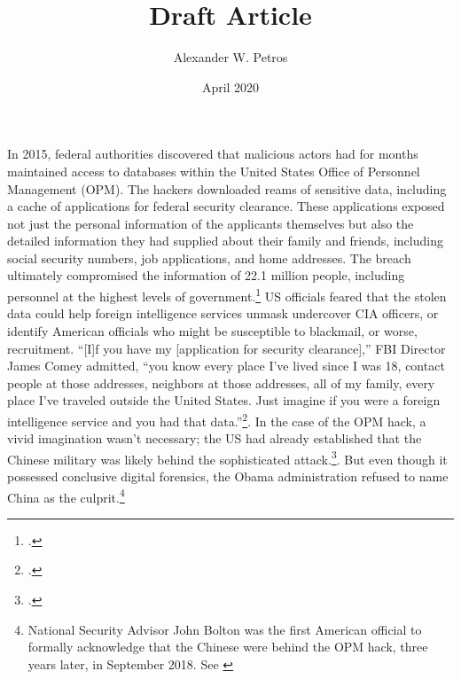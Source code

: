 \documentclass[14pt]{extarticle}
\title{Draft Article}
\author{Alexander W. Petros}
\date{April 2020}
\begin{document}
\maketitle

In 2015, federal authorities discovered that malicious actors had for months maintained access to databases within the United States Office of Personnel Management (OPM). The hackers downloaded reams of sensitive data, including a cache of applications for federal security clearance. These applications exposed not just the personal information of the applicants themselves but also the detailed information they had supplied about their family and friends, including social security numbers, job applications, and home addresses. The breach ultimately compromised the information of 22.1 million people, including personnel at the highest levels of government.\footcite{nakashima_hacks_2015} US officials feared that the stolen data could help foreign intelligence services unmask undercover CIA officers, or identify American officials who might be susceptible to blackmail, or worse, recruitment. \enquote{[I]f you have my [application for security clearance],} FBI Director James Comey admitted, ``you know every place I've lived since I was 18, contact people at those addresses, neighbors at those addresses, all of my family, every place I've traveled outside the United States. Just imagine if you were a foreign intelligence service and you had that data.''\footcite{nakashima_hacks_2015}. In the case of the OPM hack, a vivid imagination wasn't necessary; the US had already established that the Chinese military was likely behind the sophisticated attack.\footcite{koerner_inside_2016}. But even though it possessed conclusive digital forensics, the Obama administration refused to name China as the culprit.\footnote{National Security Advisor John Bolton was the first American official to formally acknowledge that the Chinese were behind the OPM hack, three years later, in September 2018. See \cite{sanger_trump_2018}}
\end{document}
